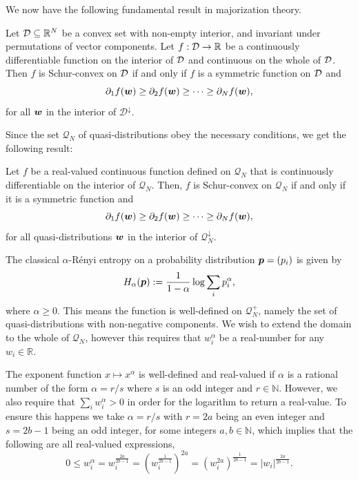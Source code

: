 \documentclass[pra,
aps,
twocolumn,
superscriptaddress,
groupedaddress,
nofootinbib,
reprint
]{revtex4-1}
\begin{document}
We now have the following fundamental result in majorization theory. 
\begin{theorem} Let ${\mathcal D}\subseteq \mathbb{R}^N$ be a convex set with non-empty interior, and invariant under permutations of vector components. Let $f: {\mathcal D} \rightarrow \mathbb{R}$ be a continuously differentiable function on the interior of ${\mathcal D}$ and continuous on the whole of ${\mathcal D}$. Then $f$ is Schur-convex on ${\mathcal D}$ if and only if $f$ is a symmetric function on ${\mathcal D}$ and 
\begin{equation}
	\partial_1 f(\boldsymbol{w}) \ge \partial_2 f(\boldsymbol{w}) \ge \cdots \ge \partial_N f(\boldsymbol{w}),
\end{equation}
for all $\boldsymbol{w}$ in the interior of $\mathcal{D}^\downarrow$.
\end{theorem}
Since the set $\mathcal{Q}_N$ of quasi-distributions obey the necessary conditions, we get the following result:
\begin{lemma}
	Let $f$ be a real-valued continuous function defined on $\mathcal{Q}_N$ that is continuously differentiable on the interior of $\mathcal{Q}_N$. 
Then, $f$ is Schur-convex on $\mathcal{Q}_N$ if and only if it is a symmetric function and
\begin{equation}
	\partial_1 f(\boldsymbol{w}) \ge \partial_2 f(\boldsymbol{w}) \ge \cdots \ge \partial_N f(\boldsymbol{w}),
\end{equation}
for all quasi-distributions $\boldsymbol{w}$ in the interior of $\mathcal{Q}^\downarrow_N$.
\end{lemma}


The classical $\alpha$-R\'{e}nyi entropy on a probability distribution $\boldsymbol{p} = (p_i)$ is given by
\begin{equation}
	H_\alpha(\boldsymbol{p}) := \frac{1}{1-\alpha} \log \sum_i p_i^\alpha,
\end{equation}
where $\alpha \ge 0$. This means the function is well-defined on $\mathcal{Q}_N^+$, namely the set of quasi-distributions with non-negative components. We wish to extend the domain to the whole of $\mathcal{Q}_N$, however this requires that $w_i^\alpha$ be a real-number for any $w_i \in \mathbb{R}$. 

The exponent function $x \mapsto x^\alpha$ is well-defined and real-valued if $\alpha$ is a rational number of the form $\alpha = r / s$ where $s$ is an odd integer and $r \in \mathbb{N}$. However, we also require that $\sum_i w_i^\alpha > 0$ in order for the logarithm to return a real-value. To ensure this happens we take $\alpha = r/s$ with $r=2a$ being an even integer and $s=2b-1$ being an odd integer, for some integers $a,b\in  \mathbb{N}$, which implies that the following are all real-valued expressions,
\begin{equation}
0 \le w_i^\alpha = w_i^{\frac{2a}{2b-1}} = \left (w_i^{\frac{1}{2b-1}}\right )^{2a} =\left (w_i^{2a}\right )^{\frac{1}{2b-1}} = |w_i|^{\frac{2a}{2b-1}}.
\end{equation}
\end{document}
